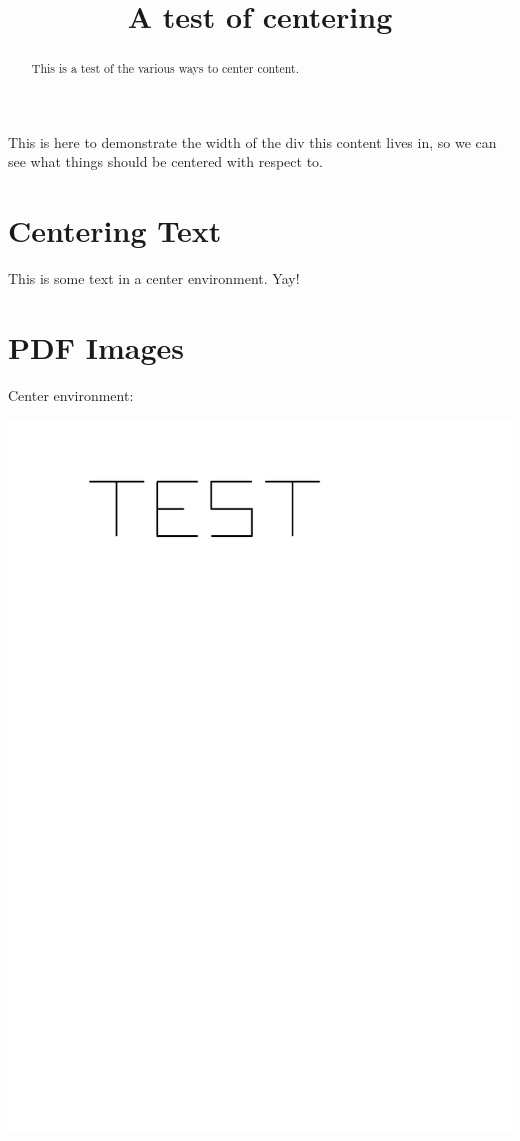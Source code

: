 \documentclass{ximera}
\title{A test of centering}
\begin{document}
\begin{abstract}
This is a test of the various ways to center content.
\end{abstract}
\maketitle

\begin{problem}
This is here to demonstrate the width of the div this content lives in, so we can see what things should be centered with respect to.
\end{problem}

\section{Centering Text}

\begin{center}
This is some text in a center environment. Yay!
\end{center}



\section{PDF Images}

Center environment: 

\begin{center}
\includegraphics{TestImagePDF}
\end{center}
\end{document}
